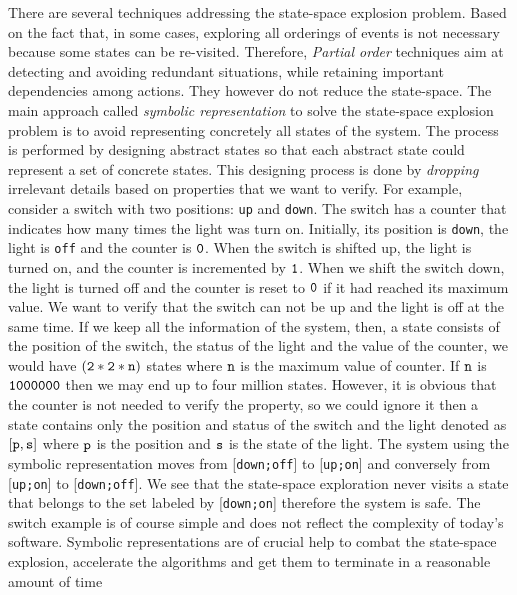                    
There are several techniques addressing the state-space explosion problem.
Based on the fact that, in some cases, exploring all orderings of events is not necessary because some states can be re-visited. Therefore, \emph{Partial order} techniques aim at detecting and avoiding
redundant situations, while retaining important dependencies among
actions. They however do not reduce the state-space. 
 The main approach called \emph{symbolic
   representation}  to solve the state-space explosion problem is
 to avoid representing concretely all states of the system. The process  is performed by designing abstract states so that each abstract state could represent a set of concrete states.
This designing process is done by \emph{dropping} irrelevant details based on properties that we want to verify. For  example, consider a switch with two positions: {\tt up} and {\tt down}. The switch has  a counter that indicates how many times the light was turn  on. Initially, its position is {\tt down}, the light is {\tt off} and the counter is $\tt 0$. When the switch is shifted up, the light is turned on, and the counter is incremented by $\tt 1$. When we shift the switch down, the light is turned off and the counter is reset to $\tt 0$ if it had reached its maximum value. We want to verify that the switch can not be up and the light is off at the same time. If we keep all the information of the system, then, a state consists of the position of the switch, the status of the light and the value of the counter, we would have $\tt (2*2*n)$ states where $\tt n$ is the maximum value of counter. If $\tt n$ is $\tt 1000000$ then we may end up to four million states.  However, it is obvious that the counter is not needed to verify the property, so we could ignore it  then a state contains only the position and status of the switch and the light denoted as $\tt [p,s]$ where $\tt p$ is the position and $\tt s$ is the state of the light. The system using the symbolic representation moves from  [{\tt down;off}]  to  [{\tt up;on}]  and conversely from  [{\tt up;on}]  to  [{\tt down;off}]. We see that the state-space exploration never visits a state that belongs to the set labeled by  [{\tt down;on}]  therefore the system is safe. The switch example is of course simple and does not reflect the complexity of today’s software. Symbolic representations are of crucial help to combat the state-space explosion, accelerate the algorithms and get them to terminate in a reasonable amount of time
